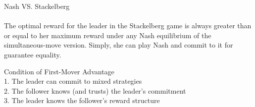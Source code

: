 \documentclass[
  course = {{IE579 Game Theory and Multi-Agent Reinforcement Learning}},
  quartile = {{4}},
  assignment = 2,
  name = {{Mohammad Mahdi Rahimi}},
  studentnumber = {{20208244}},
  email = {{mahi@kaist.ac.kr}},
  firstexercise = 1
]{aga-homework}
\begin{document}
\exercise
\subexercise Nash VS. Stackelberg
\\\\
The optimal reward for the leader in the Stackelberg game is always greater than or equal to her maximum reward under any Nash equilibrium of the simultaneous-move version. Simply, she can play Nash and commit to it for guarantee equality.

\subexercise Condition of First-Mover Advantage
\\
1. The leader can commit to mixed strategies\\
2. The follower knows (and trusts) the leader’s commitment\\
3. The leader knows the follower’s reward structure
\end{document}

